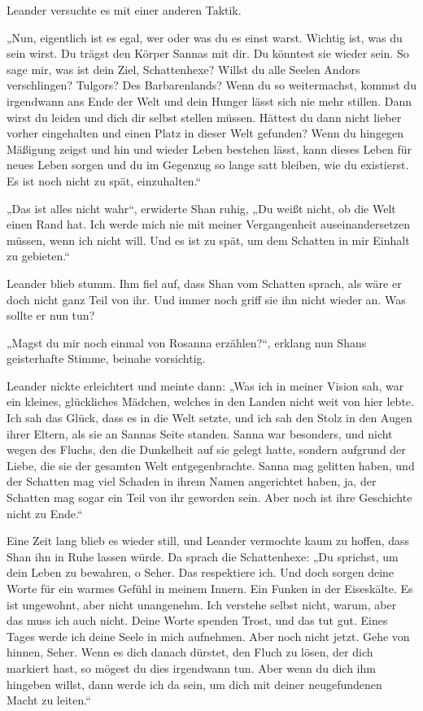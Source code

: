Leander versuchte es mit einer anderen Taktik.

„Nun, eigentlich ist es egal, wer oder was du es einst warst. Wichtig ist, was du sein wirst. Du trägst den Körper Sannas mit dir. Du könntest sie wieder sein. So sage mir, was ist dein Ziel, Schattenhexe? Willst du alle Seelen Andors verschlingen? Tulgors? Des Barbarenlands? Wenn du so weitermachst, kommst du irgendwann ans Ende der Welt und dein Hunger lässt sich nie mehr stillen. Dann wirst du leiden und dich dir selbst stellen müssen. Hättest du dann nicht lieber vorher eingehalten und einen Platz in dieser Welt gefunden? Wenn du hingegen Mäßigung zeigst und hin und wieder Leben bestehen lässt, kann dieses Leben für neues Leben sorgen und du im Gegenzug so lange satt bleiben, wie du existierst. Es ist noch nicht zu spät, einzuhalten.“

„Das ist alles nicht wahr“, erwiderte Shan ruhig, „Du weißt nicht, ob die Welt einen Rand hat. Ich werde mich nie mit meiner Vergangenheit auseinandersetzen müssen, wenn ich nicht will. Und es ist zu spät, um dem Schatten in mir Einhalt zu gebieten.“

Leander blieb stumm. Ihm fiel auf, dass Shan vom Schatten sprach, als wäre er doch nicht ganz Teil von ihr. Und immer noch griff sie ihn nicht wieder an. Was sollte er nun tun?

„Magst du mir noch einmal von Rosanna erzählen?“, erklang nun Shans geisterhafte Stimme, beinahe vorsichtig.

Leander nickte erleichtert und meinte dann: „Was ich in meiner Vision sah, war ein kleines, glückliches Mädchen, welches in den Landen nicht weit von hier lebte. Ich sah das Glück, dass es in die Welt setzte, und ich sah den Stolz in den Augen ihrer Eltern, als sie an Sannas Seite standen. Sanna war besonders, und nicht wegen des Fluchs, den die Dunkelheit auf sie gelegt hatte, sondern aufgrund der Liebe, die sie der gesamten Welt entgegenbrachte. Sanna mag gelitten haben, und der Schatten mag viel Schaden in ihrem Namen angerichtet haben, ja, der Schatten mag sogar ein Teil von ihr geworden sein. Aber noch ist ihre Geschichte nicht zu Ende.“

Eine Zeit lang blieb es wieder still, und Leander vermochte kaum zu hoffen, dass Shan ihn in Ruhe lassen würde. Da sprach die Schattenhexe: „Du sprichst, um dein Leben zu bewahren, o Seher. Das respektiere ich. Und doch sorgen deine Worte für ein warmes Gefühl in meinem Innern. Ein Funken in der Eiseskälte. Es ist ungewohnt, aber nicht unangenehm. Ich verstehe selbst nicht, warum, aber das muss ich auch nicht. Deine Worte spenden Trost, und das tut gut. Eines Tages werde ich deine Seele in mich aufnehmen. Aber noch nicht jetzt. Gehe von hinnen, Seher. Wenn es dich danach dürstet, den Fluch zu lösen, der dich markiert hast, so mögest du dies irgendwann tun. Aber wenn du dich ihm hingeben willst, dann werde ich da sein, um dich mit deiner neugefundenen Macht zu leiten.“

